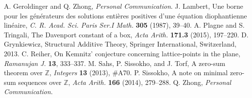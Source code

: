 \documentclass[12 pt]{amsart}
\begin{document}
\begin{thebibliography}{18}
 A. Geroldinger and Q. Zhong, {\em Personal Communication}.
 J. Lambert, Une borne pour les g\'en\'erateurs des solutions enti\`eres positives 
d'une \'equation diophantienne lin\'eaire, {\em C. R. Acad. Sci. Paris Ser.I Math.} {\bf 305} (1987), 39--40.
 A. Plagne and S. Tringali, 
The Davenport constant of a box, 
{\em Acta Arith.} {\bf 171.3} (2015), 197--220.
 D. Grynkiewicz, Structural Additive Theory, Springer International, Switzerland, 2013.
 C. Reiher, On Kemnitz' conjecture concerning lattice-points in the plane, {\em Ramanujan J.} {\bf 13},
 333--337.
 M. Sahs, P. Sissokho, and J. Torf, A zero-sum theorem over 
$\mathbb{Z}$,
{\em Integers} {\bf 13} (2013), \#A70.
 P. Sissokho, A note on minimal zero-sum sequences over 
${\mathbb Z}$, {\em Acta Arith.} {\bf 166} (2014), 279--288.
 Q. Zhong, {\em Personal Communication}.
\end{thebibliography}
\end{document}
